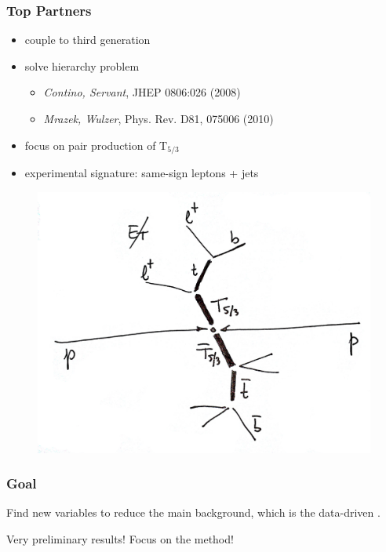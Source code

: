 \documentclass[ukenglish]{beamer}
\begin{document}
\begin{frame}
    \frametitle{Top Partners}
    \begin{itemize}
        \item couple to third generation
        \item solve hierarchy problem
            \begin{itemize}
                \item \emph{Contino, Servant}, JHEP 0806:026 (2008)
                \item \emph{Mrazek, Wulzer}, Phys. Rev. D81, 075006 (2010)
            \end{itemize}
        \item focus on pair production of $\mathrm{T}_{5/3}$
        \item experimental signature: same-sign leptons + jets
    \end{itemize}
    \begin{figure}[h]
        \centering
        \includegraphics[height=.5\textheight]{toppartner_decay_top.eps}
    \end{figure}
\end{frame}

\begin{frame}
    \frametitle{Goal}
    \begin{block}
        {}
        Find new variables to reduce the main background, which is the
        data-driven \ttbar.
    \end{block}
    \alert{Very preliminary results! Focus on the method!}
\end{frame}
\end{document}
